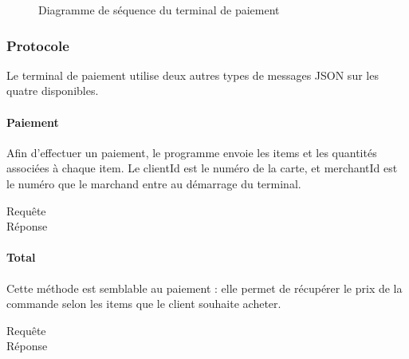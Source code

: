 		\begin{figure}
			\centering
			
			\caption{Diagramme de séquence du terminal de paiement}
			\label{fig.paieseq}
		\end{figure}

		\subsubsection{Protocole}
		Le terminal de paiement utilise deux autres types de messages JSON sur les quatre disponibles.
		
			\paragraph{Paiement}
			Afin d’effectuer un paiement, le programme envoie les items et les quantités associées à chaque item. Le \og clientId \fg{} est le numéro de la carte, et \og merchantId \fg{} est le numéro que le marchand entre au démarrage du terminal.
			\begin{multicols}{2}	
				\begin{description}
					\item[Requête]  %
					
					\vfill\null \columnbreak
					\item[Réponse]  %
					
				\end{description}
			\end{multicols}

			\paragraph{Total}
			Cette méthode est semblable au paiement : elle permet de récupérer le prix de la commande selon les items que le client souhaite acheter.
			\begin{multicols}{2}	
				\begin{description}
					\item[Requête]  %
					
					\vfill\null \columnbreak
					\item[Réponse]  %
					
				\end{description}
			\end{multicols}

